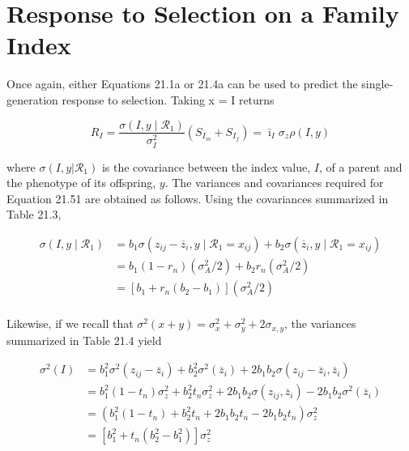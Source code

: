 \documentclass{article}
\begin{document}
\section{Response to Selection on a Family Index}
Once again, either Equations 21.1a or 21.4a can be used to predict the single-generation response to selection. Taking x = I returns

\begin{equation}
R_{I}=\frac{\sigma(I,y\mid\mathcal{R}_{1})}{\sigma_{I}^{2}}\left(S_{I_{m}}+S_{I_{f}}\right)=\bar{\imath}_{I}\sigma_{z}\rho(I,y)
\tag{21.51}
\label{eq:21_51}
\end{equation}

where  $ \sigma(I,y|\mathcal{R}_{1}) $ is the covariance between the index value,  $ I $, of a parent and the phenotype of its offspring,  $ y $. The variances and covariances required for Equation 21.51 are obtained as follows. Using the covariances summarized in Table 21.3,

\begin{equation}
\begin{aligned}\sigma(I,y\mid\mathcal{R}_{1})&=b_{1}\sigma(z_{ij}-\overline{z}_{i},y\mid\mathcal{R}_{1}=x_{ij})+b_{2}\sigma(\overline{z}_{i},y\mid\mathcal{R}_{1}=x_{ij})\\&=b_{1}\left(1-r_{n}\right)(\sigma_{A}^{2}/2)+b_{2}r_{n}(\sigma_{A}^{2}/2)\\&=\left[b_{1}+r_{n}(b_{2}-b_{1})\right](\sigma_{A}^{2}/2)\\ \end{aligned}
\tag{21.52a}
\label{eq:21_52a}
\end{equation}

Likewise, if we recall that  $ \sigma^{2}(x+y)=\sigma_{x}^{2}+\sigma_{y}^{2}+2\sigma_{x,y} $, the variances summarized in Table 21.4 yield

\begin{equation}
\begin{aligned}\sigma^{2}(I)&=b_{1}^{2}\sigma^{2}(z_{ij}-\overline{z}_{i})+b_{2}^{2}\sigma^{2}(\overline{z}_{i})+2b_{1}b_{2}\sigma(z_{ij}-\overline{z}_{i},\overline{z}_{i})\\&=b_{1}^{2}\left(1-t_{n}\right)\sigma_{z}^{2}+b_{2}^{2}t_{n}\sigma_{z}^{2}+2b_{1}b_{2}\sigma(z_{ij},\overline{z}_{i})-2b_{1}b_{2}\sigma^{2}(\overline{z}_{i})\\&=\left(b_{1}^{2}\left(1-t_{n}\right)+b_{2}^{2}t_{n}+2b_{1}b_{2}t_{n}-2b_{1}b_{2}t_{n}\right)\sigma_{z}^{2}\\&=\left[b_{1}^{2}+t_{n}(b_{2}^{2}-b_{1}^{2})\right]\sigma_{z}^{2}\\ \end{aligned}
\tag{21.52b}
\label{eq:21_52b}
\end{equation}
\end{document}
